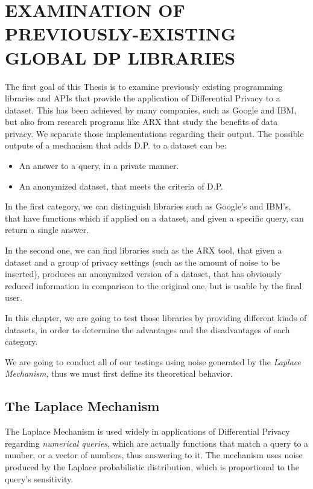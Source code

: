 \chapter{EXAMINATION OF PREVIOUSLY-EXISTING GLOBAL DP LIBRARIES}

The first goal of this Thesis is to examine previously existing programming libraries and APIs that provide the application of Differential Privacy to a dataset. This has been achieved by many companies, such as Google and IBM, but also from research programs like ARX that study the benefits of data privacy. We separate those implementations regarding their output. The possible outputs of a mechanism that adds D.P. to a dataset can be:
\begin{itemize}
    \item An answer to a query, in a private manner.
    \item An anonymized dataset, that meets the criteria of D.P.
\end{itemize}

In the first category, we can distinguish libraries such as Google's and IBM's, that have functions which if applied on a dataset, and given a specific query, can return a single answer.

In the second one, we can find libraries such as the ARX tool, that given a dataset and a group of privacy settings (such as the amount of noise to be inserted), produces an anonymized version of a dataset, that has obviously reduced information in comparison to the original one, but is usable by the final user.

In this chapter, we are going to test those libraries by providing different kinds of datasets, in order to determine the advantages and the disadvantages of each category.

We are going to conduct all of our testings using noise generated by the \emph{Laplace Mechanism}, thus we must first define its theoretical behavior.



\section{The Laplace Mechanism}

The Laplace Mechanism is used widely in applications of Differential Privacy regarding \emph{numerical queries}, which are actually functions that match a query to a number, or a vector of numbers, thus answering to it. The mechanism uses noise produced by the Laplace probabilistic distribution, which is proportional to the query's sensitivity.

